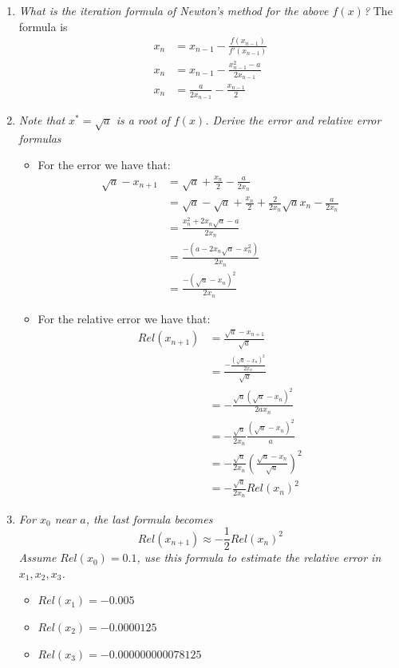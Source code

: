 \documentclass[12pt, letterpaper]{article}
\begin{document}
	\begin{enumerate}
		\item \textit{What is the iteration formula of Newton’s method for the above $f (x)$?}
		The formula is 
		\begin{align*}
			x_n &= x_{n-1} - \frac{f(x_{n-1})}{f'(x_{n-1})}\\
			x_n &= x_{n-1} - \frac{x_{n-1}^2 - a}{2x_{n-1}}\\
			x_n &= \frac{a}{2x_{n-1}} - \frac{x_{n-1}}{2} 	
		\end{align*}
		\item \textit{Note that $x^* = \sqrt{a}$ is a root of $f(x)$.  Derive the error and relative error formulas}\\
		\begin{itemize}
			\item For the error we have that:
			\begin{align*}
				\sqrt{a} - x_{n+1} &= \sqrt{a} + \frac{x_n}{2} - \frac{a}{2x_n}\\
				&=   \sqrt{a} - \sqrt{a} + \frac{x_n}{2} + \frac{2}{2x_n}\sqrt{a}x_n - \frac{a}{2x_n}\\
				&= \frac{x_n^2 + 2 x_n \sqrt{a} - a}{2x_n}\\
				&= \frac{-(a - 2 x_n \sqrt{a} - x_n^2)}{2x_n}\\
				&= \frac{-(\sqrt{a}-x_n)^2}{2x_n}
			\end{align*}
			\item For the relative error we have that: 
			\begin{align*}
			Rel(x_{n+1}) &= \frac{\sqrt{a} - x_{n+1}}{\sqrt{a}}\\
			&= \frac{- \frac{(\sqrt{a}-x_n)^2}{2x_n}}{\sqrt{a}}\\
			&= - \frac{\sqrt{a}(\sqrt{a}-x_n)^2}{2ax_n}\\
			&= -\frac{\sqrt{a}}{2x_n} \frac{(\sqrt{a}-x_n)^2}{a}\\
			&= -\frac{\sqrt{a}}{2x_n} \left( \frac{\sqrt{a}-x_n}{\sqrt{a}} \right)^2\\
			&= -\frac{\sqrt{a}}{2x_n} Rel(x_n)^2
			\end{align*}
		\end{itemize}
		\item \textit{For $x_0$ near $a$, the last formula becomes
			$$
			Rel(x_{n+1}) \approx -\frac{1}{2}Rel(x_n)^2
			$$		
			Assume $Rel(x_0) = 0.1$, use this formula to estimate the relative error in $x_1, x_2, x_3$.}
			\begin{itemize}
				\item $Rel(x_1) = -0.005$
				\item $Rel(x_2) = -0.0000125$
				\item $Rel(x_3) = -0.000000000078125$
			\end{itemize}
	\end{enumerate}
\end{document}
